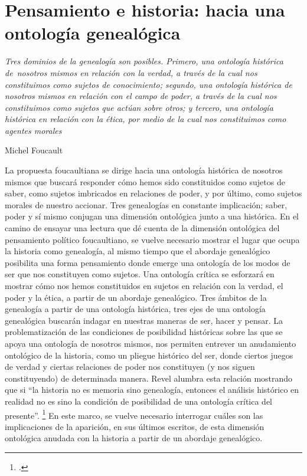 \section{Pensamiento e historia: hacia una ontología genealógica}


\epigraph{\emph{Tres dominios de la genealogía son posibles. Primero, una ontología histórica de~nosotros mismos en relación con la verdad, a través de la cual nos constituimos como sujetos de conocimiento; segundo, una ontología histórica de nosotros mismos en relación con el campo de poder, a través de la cual nos constituimos como sujetos que actúan sobre otros; y tercero, una ontología histórica en relación con la ética, por medio de la cual nos constituimos como agentes morales}}{Michel Foucault}


La propuesta foucaultiana se dirige hacia una ontología histórica de nosotros mismos que buscará responder cómo hemos sido constituidos como sujetos de saber, como sujetos imbricados en relaciones de poder, y por último, como sujetos morales de nuestro accionar. Tres genealogías en constante implicación; saber, poder y sí mismo conjugan una dimensión ontológica junto a una histórica. En el camino de ensayar una lectura que dé cuenta de la dimensión ontológica del pensamiento político foucaultiano, se vuelve necesario mostrar el lugar que ocupa la historia como genealogía, al mismo tiempo que el abordaje genealógico posibilita una forma pensamiento donde emerge una ontología de los modos de ser que nos constituyen como sujetos. Una ontología crítica se esforzará en mostrar cómo nos hemos constituidos en sujetos en relación con la verdad, el poder y la ética, a partir de un abordaje genealógico. Tres ámbitos de la genealogía a partir de una ontología histórica, tres ejes de una ontología genealógica buscarán indagar en nuestras maneras de ser, hacer y pensar. La problematización de las condiciones de posibilidad históricas sobre las que se apoya una ontología de nosotros mismos, nos permiten entrever un anudamiento ontológico de la historia, como un pliegue histórico del ser, donde ciertos juegos de verdad y ciertas relaciones de poder nos constituyen (y nos siguen constituyendo) de determinada manera. Revel alumbra esta relación mostrando que si \enquote{la historia no es memoria sino genealogía, entonces el análisis histórico en realidad no es sino la condición de posibilidad de una ontología crítica del presente}. \footcite[][58]{@7041-REVEL2008} En este marco, se vuelve necesario interrogar cuáles son las implicaciones de la aparición, en sus últimos escritos, de esta dimensión ontológica anudada con la historia a partir de un abordaje genealógico.

